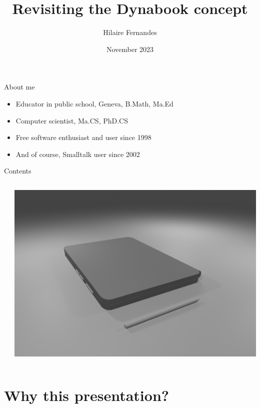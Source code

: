 \documentclass{beamer}
\title{Revisiting the Dynabook concept}
\author{Hilaire Fernandes}
\institute[DIP, Geneva]{Department of Public Instruction \\ Geneva}
\date{November 2023}
\begin{document}
\begin{frame}
  \titlepage
\end{frame}
%
\begin{frame}{About me}
  \fontsize{12pt}{30pt}\selectfont
  \begin{itemize}
  \item Educator in public school, Geneva, B.Math, Ma.Ed
  \item Computer scientist, Ma.CS, PhD.CS
  \item Free software enthusiast and user since 1998
  \item And of course, Smalltalk user since 2002
  \end{itemize}
\end{frame}
%
\begin{frame}{Contents}
  \begin{columns}
    \begin{column}{0.5\textwidth}
      \tableofcontents[hideallsubsections]      
    \end{column}
    \begin{column}{0.5\textwidth}
      \includegraphics[width=\textwidth]{image2-sm.png}      
    \end{column}
  \end{columns}
\end{frame}

\section{Why this presentation?}
\end{document}
